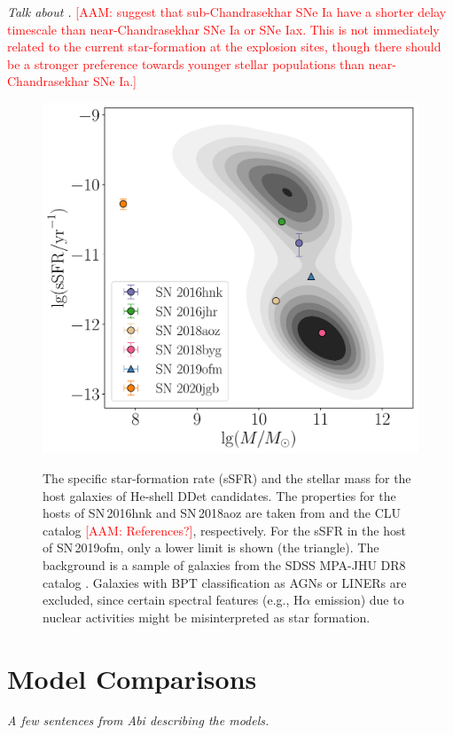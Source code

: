 \documentclass[twocolumn]{aastex631}
\newcommand{\adam}[1]{\textcolor{red}{[AAM: #1]}}
\begin{document}
{\it Talk about \citet{de_los_reyes_manganese_2020}.} \adam{\citet{de_los_reyes_manganese_2020} suggest that sub-Chandrasekhar SNe Ia have a shorter delay timescale than near-Chandrasekhar SNe Ia or SNe Iax. This is not immediately related to the current star-formation at the explosion sites, though there should be a stronger preference towards younger stellar populations than near-Chandrasekhar SNe Ia.}
\begin{figure}
    \centering
    \includegraphics[width=\linewidth]{host.pdf}
    \label{fig:host}
    \caption{The specific star-formation rate (sSFR) and the stellar mass for the host galaxies of He-shell DDet candidates. The properties for the hosts of SN\,2016hnk and SN\,2018aoz are taken from \citet{galbany_16hnk_2019} and the CLU catalog \adam{References?}, respectively. For the sSFR in the host of SN\,2019ofm, only a lower limit is shown (the triangle). The background is a sample of galaxies from the SDSS MPA-JHU DR8 catalog \citep{Kauffmann_SDSS_2003,Brinchmann_SDSS_2004}. Galaxies with BPT classification as AGNs or LINERs are excluded, since certain spectral features (e.g., H$\alpha$ emission) due to nuclear activities might be misinterpreted as star formation.}
\end{figure}

\section{Model Comparisons} \label{sec:model}
{\it A few sentences from Abi describing the models.}
\end{document}
